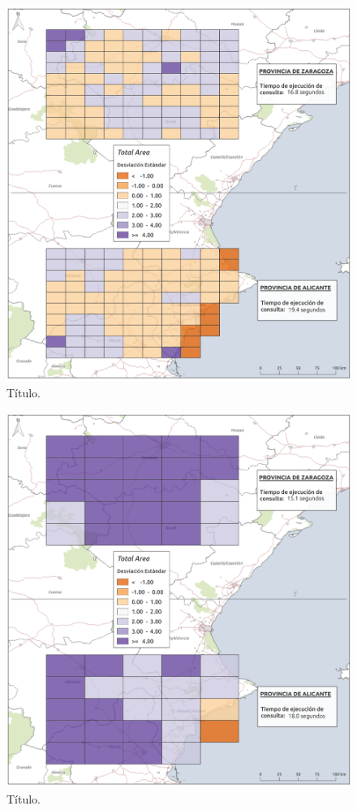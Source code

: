\begin{figure}
\begin{center}
\includegraphics[width=\textwidth]{ResultadosyDiscusion/Figs/Results/l_50.png}
\caption{Título.}
\end{center}
\end{figure}

\begin{figure}
\begin{center}
\includegraphics[width=\textwidth]{ResultadosyDiscusion/Figs/Results/l_100.png}
\caption{Título.}
\end{center}
\end{figure}